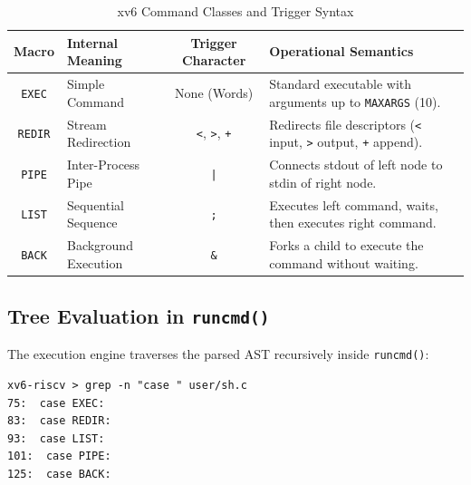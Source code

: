 \documentclass[12pt,a4paper]{article}
\begin{document}
\begin{table}[H]
\centering
\caption{xv6 Command Classes and Trigger Syntax}
\label{tab:xv6_cmd_types}
\begin{tabularx}{\textwidth}{c l c X}
\toprule
\textbf{Macro} & \textbf{Internal Meaning} & \textbf{Trigger Character} & \textbf{Operational Semantics} \\
\midrule
\texttt{EXEC}  & Simple Command       & None (Words)       & Standard executable with arguments up to \texttt{MAXARGS} (10). \\
\texttt{REDIR} & Stream Redirection   & \texttt{<}, \texttt{>}, \texttt{+} & Redirects file descriptors (\texttt{<} input, \texttt{>} output, \texttt{+} append). \\
\texttt{PIPE}  & Inter-Process Pipe   & \texttt{|}         & Connects stdout of left node to stdin of right node. \\
\texttt{LIST}  & Sequential Sequence  & \texttt{;}         & Executes left command, waits, then executes right command. \\
\texttt{BACK}  & Background Execution & \texttt{\&}         & Forks a child to execute the command without waiting. \\
\bottomrule
\end{tabularx}
\end{table}

\subsection{Tree Evaluation in \texttt{runcmd()}}
The execution engine traverses the parsed AST recursively inside \texttt{runcmd()}:

\begin{lstlisting}[style=consolestyle, caption={AST execution dispatch in user/sh.c}]
xv6-riscv > grep -n "case " user/sh.c
75:  case EXEC:
83:  case REDIR:
93:  case LIST:
101:  case PIPE:
125:  case BACK:
\end{lstlisting}
\end{document}
